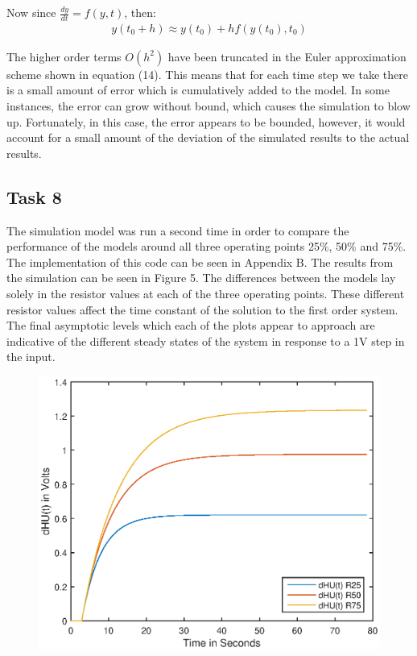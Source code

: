 \documentclass{article}
\begin{document}
Now since $\frac{dy}{dt} = f(y,t)$, then:
\begin{align}
	y(t_0+h) \approx y(t_0) + hf(y(t_0),t_0)
\end{align}

The higher order terms $O(h^2)$ have been truncated in the Euler approximation scheme shown in equation (14). This means that for each time step we take there is a small amount of error which is cumulatively added to the model. In some instances, the error can grow without bound, which causes the simulation to blow up. Fortunately, in this case, the error appears to be bounded, however, it would account for a small amount of the deviation of the simulated results to the actual results.

\newpage

\subsection{Task 8}

The simulation model was run a second time in order to compare the performance of the models around all three operating points 25\%, 50\% and 75\%. The implementation of this code can be seen in Appendix B. The results from the simulation can be seen in Figure 5. The differences between the models lay solely in the resistor values at each of the three operating points. These different resistor values affect the time constant of the solution to the first order system. The final asymptotic levels which each of the plots appear to approach are indicative of the different steady states of the system in response to a 1V step in the input.

\begin{figure}[H]
	\centering
	\includegraphics[scale=0.8]{fig4.eps}
\end{figure}
\end{document}
